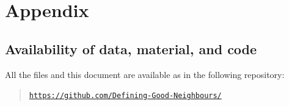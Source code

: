 \documentclass[11pt]{article}
\numberwithin{equation}{section}
\begin{document}
\newpage
{}
\appendix
\section*{Appendix}
\renewcommand{\thesubsection}{\Alph{subsection}}

\subsection{Availability of data, material, and code}
\label{app:one}
All the files and this document are available as in the following repository:
\begin{quote}
    \noindent \href{https://github.com/Defining-Good-Neighbours/}{\texttt{https://github.com/Defining-Good-Neighbours/}}
\end{quote}
\end{document}
